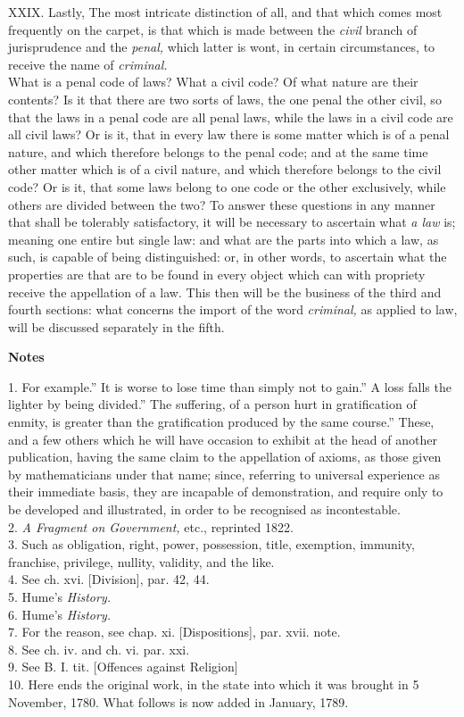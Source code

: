 \documentclass[12pt]{report}
\begin{document}
XXIX. Lastly, The most intricate distinction of all, and that which
comes most frequently on the carpet, is that which is made between the
\emph{civil} branch of jurisprudence and the \emph{penal,} which latter
is wont, in certain circumstances, to receive the name of
\emph{criminal.}\\
What is a penal code of laws? What a civil code? Of what nature are
their contents? Is it that there are two sorts of laws, the one penal
the other civil, so that the laws in a penal code are all penal laws,
while the laws in a civil code are all civil laws? Or is it, that in
every law there is some matter which is of a penal nature, and which
therefore belongs to the penal code; and at the same time other matter
which is of a civil nature, and which therefore belongs to the civil
code? Or is it, that some laws belong to one code or the other
exclusively, while others are divided between the two? To answer these
questions in any manner that shall be tolerably satisfactory, it will be
necessary to ascertain what \emph{a law} is; meaning one entire but
single law: and what are the parts into which a law, as such, is capable
of being distinguished: or, in other words, to ascertain what the
properties are that are to be found in every object which can with
propriety receive the appellation of a law. This then will be the
business of the third and fourth sections: what concerns the import of
the word \emph{criminal,} as applied to law, will be discussed
separately in the fifth.

\textbf{Notes}

1. For example.'' It is worse to lose time than simply not to
gain.'' A loss falls the lighter by being divided.'' The
suffering, of a person hurt in gratification of enmity, is greater than
the gratification produced by the same course.'' These, and a
few others which he will have occasion to exhibit at the head of another
publication, having the same claim to the appellation of axioms, as
those given by mathematicians under that name; since, referring to
universal experience as their immediate basis, they are incapable of
demonstration, and require only to be developed and illustrated, in
order to be recognised as incontestable.\\
2. \emph{A Fragment on Government,} etc., reprinted 1822.\\
3. Such as obligation, right, power, possession, title, exemption,
immunity, franchise, privilege, nullity, validity, and the like.\\
4. See ch. xvi. {[}Division{]}, par. 42, 44.\\
5. Hume's \emph{History.\\
}6. Hume's \emph{History.\\
}7. For the reason, see chap. xi. {[}Dispositions{]}, par. xvii. note.\\
8. See ch. iv. and ch. vi. par. xxi.\\
9. See B. I. tit. {[}Offences against Religion{]}\\
10. Here ends the original work, in the state into which it was brought
in 5 November, 1780. What follows is now added in January, 1789.
\end{document}
